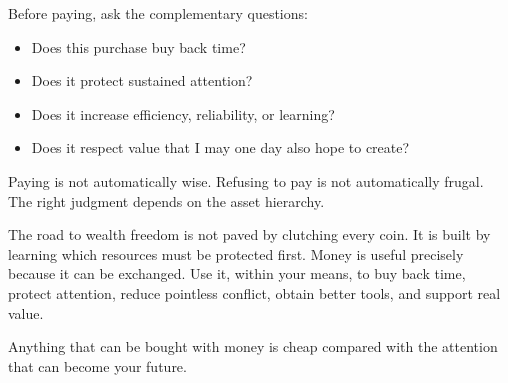 Before paying, ask the complementary questions:

\begin{itemize}
\item Does this purchase buy back time?
\item Does it protect sustained attention?
\item Does it increase efficiency, reliability, or learning?
\item Does it respect value that I may one day also hope to create?
\end{itemize}

Paying is not automatically wise. Refusing to pay is not automatically frugal. The right judgment depends on the asset hierarchy.

The road to wealth freedom is not paved by clutching every coin. It is built by learning which resources must be protected first. Money is useful precisely because it can be exchanged. Use it, within your means, to buy back time, protect attention, reduce pointless conflict, obtain better tools, and support real value.

Anything that can be bought with money is cheap compared with the attention that can become your future.
